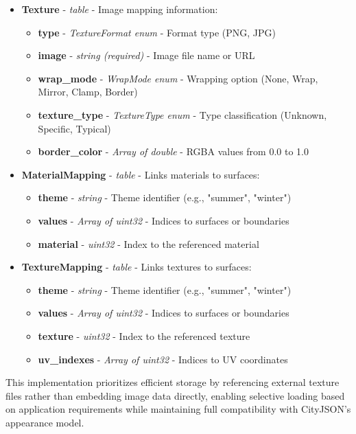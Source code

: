 \begin{itemize}
  \item \textbf{Texture} - \textit{table} - Image mapping information:
    \begin{itemize}
      \item \textbf{type} - \textit{TextureFormat enum} - Format type (PNG, JPG)
      \item \textbf{image} - \textit{string (required)} - Image file name or URL
      \item \textbf{wrap\_mode} - \textit{WrapMode enum} - Wrapping option (None, Wrap, Mirror, Clamp, Border)
      \item \textbf{texture\_type} - \textit{TextureType enum} - Type classification (Unknown, Specific, Typical)
      \item \textbf{border\_color} - \textit{Array of double} - RGBA values from 0.0 to 1.0
    \end{itemize}

  \item \textbf{MaterialMapping} - \textit{table} - Links materials to surfaces:
    \begin{itemize}
      \item \textbf{theme} - \textit{string} - Theme identifier (e.g., "summer", "winter")
      \item \textbf{values} - \textit{Array of uint32} - Indices to surfaces or boundaries
      \item \textbf{material} - \textit{uint32} - Index to the referenced material
    \end{itemize}

  \item \textbf{TextureMapping} - \textit{table} - Links textures to surfaces:
    \begin{itemize}
      \item \textbf{theme} - \textit{string} - Theme identifier (e.g., "summer", "winter")
      \item \textbf{values} - \textit{Array of uint32} - Indices to surfaces or boundaries
      \item \textbf{texture} - \textit{uint32} - Index to the referenced texture
      \item \textbf{uv\_indexes} - \textit{Array of uint32} - Indices to UV coordinates
    \end{itemize}
\end{itemize}

This implementation prioritizes efficient storage by referencing external texture files rather than embedding image data directly, enabling selective loading based on application requirements while maintaining full compatibility with CityJSON's appearance model.

